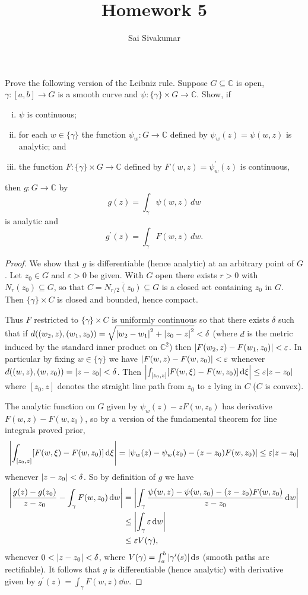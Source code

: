 \documentclass[12pt]{amsart}
\title{Homework 5}
\author{Sai Sivakumar}
\newcommand{\CC}{\mathbb{C}}
\begin{document}
\maketitle

\thispagestyle{empty}

 Prove the following version of the Leibniz rule. Suppose
 $G\subseteq \CC$ is open, $\gamma:[a,b]\to G$ is
 a smooth curve and 
  $\psi:\{\gamma\}\times G\to \CC.$  Show, if
\begin{enumerate}[(i)]
 \item  $\psi$ is continuous;
 \item  for each $w\in \{\gamma\}$
 the function $\psi_w:G\to \CC$ defined by $\psi_w(z)=\psi(w,z)$
 is analytic; and 
 \item the function $F:\{\gamma\}\times G\to \CC$
 defined by $F(w,z)=\psi_w^\prime(z)$ is continuous, 
\end{enumerate}
 then  $g:G\to \CC$ by
\[
 g(z) =\int_\gamma \psi(w,z) \, dw
\]
 is analytic and
\[
 g^\prime(z) = \int_\gamma F(w,z) \, dw.
\]




\bigskip

\begin{proof}
\baselineskip=24pt
We show that $g$ is differentiable (hence analytic) at an arbitrary point of $G$. Let $z_0\in G$ and $\varepsilon>0$ be given. With $G$ open there exists $r>0$ with $N_r(z_0)\subseteq G$, so that $C = \overline{N_{r/2}(z_0)}\subseteq G$ is a closed set containing $z_0$ in $G$. Then $\{\gamma\}\times C$ is closed and bounded, hence compact. 

Thus $F$ restricted to $\{\gamma\}\times C$ is uniformly continuous so that there exists $\delta$ such that if $d((w_2,z),(w_1,z_0)) = \sqrt{\abs{w_2-w_1}^2+\abs{z_0-z}^2}<\delta$ (where $d$ is the metric induced by the standard inner product on $\mathbb{C}^2$) then $\abs{F(w_2,z)-F(w_1,z_0)}<\varepsilon$. In particular by fixing $w\in \{\gamma\}$ we have $\abs{F(w,z)-F(w,z_0)}<\varepsilon$ whenever $d((w,z),(w,z_0)) = \abs{z-z_0} <\delta$. Then $\abs{\int_{[z_0,z]}[F(w,\xi) - F(w,z_0)]\dd{\xi}}\leq \varepsilon\abs{z-z_0}$ where $[z_0,z]$ denotes the straight line path from $z_0$ to $z$ lying in $C$ ($C$ is convex).

The analytic function on $G$ given by $\psi_w(z)-zF(w,z_0)$ has derivative $F(w,z)-F(w,z_0)$, so by a version of the fundamental theorem for line integrals proved prior, \[\abs{\int_{[z_0,z]}[F(w,\xi) - F(w,z_0)]\dd{\xi}} = \abs{\psi_w(z)-\psi_w(z_0)-(z-z_0)F(w,z_0)}\leq \varepsilon\abs{z-z_0}\] whenever $\abs{z-z_0}<\delta$. So by definition of $g$ we have \begin{align*}
  \abs{\frac{g(z)-g(z_0)}{z-z_0} - \int_\gamma F(w,z_0)\dd{w}} &= \abs{\int_\gamma \frac{\psi(w,z) - \psi(w,z_0) - (z-z_0)F(w,z_0)}{z-z_0}\dd{w}}\\
  &\leq \abs{\int_\gamma \varepsilon\dd{w}}\\
  &\leq \varepsilon V(\gamma),
\end{align*} whenever $0<\abs{z-z_0}<\delta$, where $V(\gamma) = \int_a^b\abs{\gamma^\prime(s)}\dd{s}$ (smooth paths are rectifiable). It follows that $g$ is differentiable (hence analytic) with derivative given by $g^\prime(z) = \int_\gamma F(w,z)\dd{w}$.
\end{proof}
\end{document}
